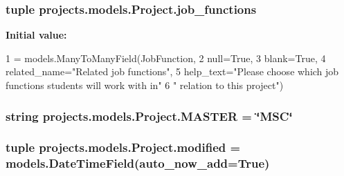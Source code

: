 \hypertarget{classprojects_1_1models_1_1_project_a3bde62b2dc114b1a43400f6d65819039}{
\subsubsection[{job\-\_\-functions}]{\setlength{\rightskip}{0pt plus 5cm}tuple projects.\-models.\-Project.\-job\-\_\-functions\hspace{0.3cm}{\ttfamily [static]}}}\label{classprojects_1_1models_1_1_project_a3bde62b2dc114b1a43400f6d65819039}
{\bfseries Initial value\-:}
\begin{DoxyCode}
1 = models.ManyToManyField(JobFunction,
2                                            null=\textcolor{keyword}{True},
3                                            blank=\textcolor{keyword}{True},
4                                            related\_name=\textcolor{stringliteral}{"Related job functions"},
5                                            help\_text=\textcolor{stringliteral}{"Please choose which job functions students will work
       with in"}
6                                                      \textcolor{stringliteral}{" relation to this project"})
\end{DoxyCode}
\hypertarget{classprojects_1_1models_1_1_project_a07c53fc2393e77a3cd5ae3c12f4d4441}{
\subsubsection[{M\-A\-S\-T\-E\-R}]{\setlength{\rightskip}{0pt plus 5cm}string projects.\-models.\-Project.\-M\-A\-S\-T\-E\-R = \char`\"{}M\-S\-C\char`\"{}\hspace{0.3cm}{\ttfamily [static]}}}\label{classprojects_1_1models_1_1_project_a07c53fc2393e77a3cd5ae3c12f4d4441}
\hypertarget{classprojects_1_1models_1_1_project_ada2e74dbe16babff749ec80058bfcd99}{
\subsubsection[{modified}]{\setlength{\rightskip}{0pt plus 5cm}tuple projects.\-models.\-Project.\-modified = models.\-Date\-Time\-Field(auto\-\_\-now\-\_\-add=True)\hspace{0.3cm}{\ttfamily [static]}}}\label{classprojects_1_1models_1_1_project_ada2e74dbe16babff749ec80058bfcd99}
